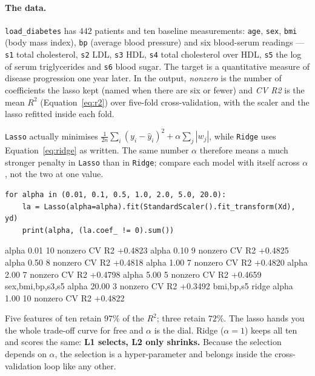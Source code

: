 \documentclass[11pt]{article}
\begin{document}
\paragraph{The data.} \texttt{load\_diabetes} has $442$ patients and ten
baseline measurements: \texttt{age}, \texttt{sex}, \texttt{bmi} (body mass
index), \texttt{bp} (average blood pressure) and six blood-serum readings ---
\texttt{s1} total cholesterol, \texttt{s2} LDL, \texttt{s3} HDL, \texttt{s4}
total cholesterol over HDL, \texttt{s5} the log of serum triglycerides and
\texttt{s6} blood sugar. The target is a quantitative measure of disease
progression one year later. In the output, \emph{nonzero} is the number of
coefficients the lasso kept (named when there are six or fewer) and
\emph{CV R2} is the mean $R^2$ (Equation~\eqref{eq:r2}) over five-fold
cross-validation, with the scaler and the lasso refitted inside each fold.

\begin{caution}
\texttt{Lasso} actually minimises
$\frac{1}{2n}\sum_i (y_i - \hat y_i)^2 + \alpha \sum_j |w_j|$, while
\texttt{Ridge} uses Equation~\eqref{eq:ridge} as written. The same number
$\alpha$ therefore means a much stronger penalty in \texttt{Lasso} than in
\texttt{Ridge}; compare each model with itself across $\alpha$, not the two
at one value.
\end{caution}


\begin{lstlisting}
for alpha in (0.01, 0.1, 0.5, 1.0, 2.0, 5.0, 20.0):
    la = Lasso(alpha=alpha).fit(StandardScaler().fit_transform(Xd), yd)
    print(alpha, (la.coef_ != 0).sum())
\end{lstlisting}
\begin{codeout}
   alpha  0.01  10 nonzero  CV R2 +0.4823
   alpha  0.10   9 nonzero  CV R2 +0.4825
   alpha  0.50   8 nonzero  CV R2 +0.4818
   alpha  1.00   7 nonzero  CV R2 +0.4820
   alpha  2.00   7 nonzero  CV R2 +0.4798
   alpha  5.00   5 nonzero  CV R2 +0.4659  sex,bmi,bp,s3,s5
   alpha 20.00   3 nonzero  CV R2 +0.3492  bmi,bp,s5
   ridge alpha 1.00  10 nonzero  CV R2 +0.4822
\end{codeout}

Five features of ten retain $97\%$ of the $R^2$; three retain $72\%$. The
lasso hands you the whole trade-off curve for free and $\alpha$ is the dial.
Ridge ($\alpha = 1$) keeps all ten and scores the same: \textbf{L1
selects, L2 only shrinks.} Because the selection depends on $\alpha$, the selection
is a hyper-parameter and belongs inside the cross-validation loop like any
other.
\end{document}
